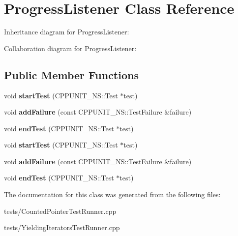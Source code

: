 \hypertarget{classProgressListener}{}\section{Progress\+Listener Class Reference}
\label{classProgressListener}


Inheritance diagram for Progress\+Listener\+:


Collaboration diagram for Progress\+Listener\+:
\subsection*{Public Member Functions}
\begin{DoxyCompactItemize}
\item 
\mbox{\label{classProgressListener_a6546ed5a9e71c492c2e774cabee443c3}} 
void {\bfseries start\+Test} (C\+P\+P\+U\+N\+I\+T\+\_\+\+N\+S\+::\+Test $\ast$test)
\item 
\mbox{\label{classProgressListener_afccc7593057ac88529f0d46eb783d45b}} 
void {\bfseries add\+Failure} (const C\+P\+P\+U\+N\+I\+T\+\_\+\+N\+S\+::\+Test\+Failure \&failure)
\item 
\mbox{\label{classProgressListener_a12232b9e94b43fbf161db1b6fbac75c7}} 
void {\bfseries end\+Test} (C\+P\+P\+U\+N\+I\+T\+\_\+\+N\+S\+::\+Test $\ast$test)
\item 
\mbox{\label{classProgressListener_a6546ed5a9e71c492c2e774cabee443c3}} 
void {\bfseries start\+Test} (C\+P\+P\+U\+N\+I\+T\+\_\+\+N\+S\+::\+Test $\ast$test)
\item 
\mbox{\label{classProgressListener_afccc7593057ac88529f0d46eb783d45b}} 
void {\bfseries add\+Failure} (const C\+P\+P\+U\+N\+I\+T\+\_\+\+N\+S\+::\+Test\+Failure \&failure)
\item 
\mbox{\label{classProgressListener_a12232b9e94b43fbf161db1b6fbac75c7}} 
void {\bfseries end\+Test} (C\+P\+P\+U\+N\+I\+T\+\_\+\+N\+S\+::\+Test $\ast$test)
\end{DoxyCompactItemize}


The documentation for this class was generated from the following files\+:\begin{DoxyCompactItemize}
\item 
tests/Counted\+Pointer\+Test\+Runner.\+cpp\item 
tests/Yielding\+Iterators\+Test\+Runner.\+cpp\end{DoxyCompactItemize}
